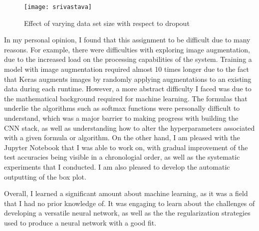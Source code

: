 \documentclass{article}
\begin{document}
\begin{figure}
    \begin{center}
        \texttt{[image: srivastava]}
        \caption{Effect of varying data set size with respect to dropout\autocite{srivastava14}}
        \label{fig:srivastava}
    \end{center}
\end{figure}

In my personal opinion, I found that this assignment to be difficult due to many reasons. For example, there were difficulties with exploring image augmentation, due to the increased load on the processing capabilities of the system. Training a model with image augmentation required almost 10 times longer due to the fact that Keras augments images by randomly applying augmentations to an existing data during each runtime. However, a more abstract difficulty I faced was due to the mathematical background required for machine learning. The formulas that underlie the algorithms such as softmax functions were personally difficult to understand, which was a major barrier to making progress with building the CNN stack, as well as understanding how to alter the hyperparameters associated with a given formula or algorithm. On the other hand, I am pleased with the Jupyter Notebook that I was able to work on, with gradual improvement of the test accuracies being visible in a chronologial order, as well as the systematic experiments that I conducted. I am also pleased to develop the automatic outputting of the box plot. 

Overall, I learned a significant amount about machine learning, as it was a field that I had no prior knowledge of. It was engaging to learn about the challenges of developing a versatile neural network, as well as the the regularization strategies used to produce a neural network with a good fit.
\end{document}
